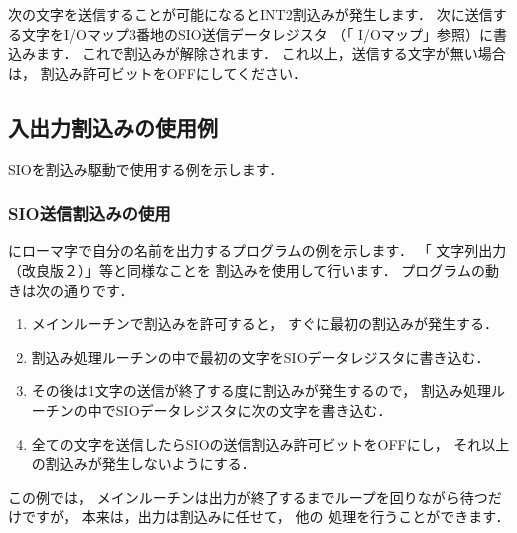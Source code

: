 次の文字を送信することが可能になるとINT2割込みが発生します．
次に送信する文字をI/Oマップ3番地のSIO送信データレジスタ
（「 I/Oマップ」参照）に書込みます．
これで割込みが解除されます．
これ以上，送信する文字が無い場合は，
割込み許可ビットをOFFにしてください．

\subsection{入出力割込みの使用例}
SIOを割込み駆動で使用する例を示します．

\subsubsection{SIO送信割込みの使用}
にローマ字で自分の名前を出力するプログラムの例を示します．
「 文字列出力（改良版２）」等と同様なことを
割込みを使用して行います．
プログラムの動きは次の通りです．

\begin{enumerate}
\item メインルーチンで割込みを許可すると，
すぐに最初の割込みが発生する．
\item 割込み処理ルーチンの中で最初の文字をSIOデータレジスタに書き込む．
\item その後は1文字の送信が終了する度に割込みが発生するので，
割込み処理ルーチンの中でSIOデータレジスタに次の文字を書き込む．
\item 全ての文字を送信したらSIOの送信割込み許可ビットをOFFにし，
それ以上の割込みが発生しないようにする．
\end{enumerate}

この例では，
メインルーチンは出力が終了するまでループを回りながら待つだけですが，
本来は，出力は割込みに任せて，
他の
処理を行うことができます．

